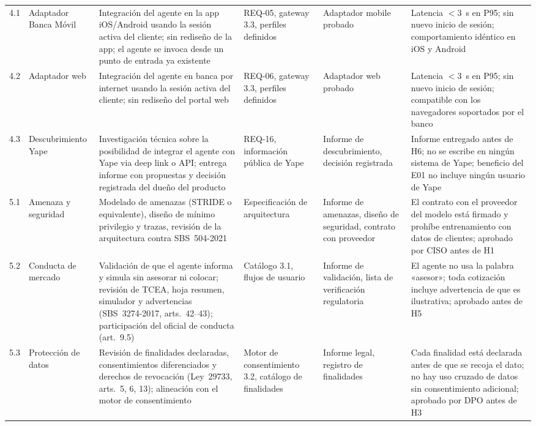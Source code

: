 \documentclass[11pt]{article}
\begin{document}
\begin{longtable}{@{}p{0.7cm} p{2.1cm} p{3.3cm} p{2.3cm} p{2.3cm} p{2.9cm}@{}}
\midrule
4.1 & Adaptador Banca Móvil & Integración del agente en la app iOS/Android usando la sesión activa del cliente; sin rediseño de la app; el agente se invoca desde un punto de entrada ya existente & REQ-05, gateway 3.3, perfiles definidos & Adaptador mobile probado & Latencia $<3$~s en P95; sin nuevo inicio de sesión; comportamiento idéntico en iOS y Android \\[0.3em]
4.2 & Adaptador web & Integración del agente en banca por internet usando la sesión activa del cliente; sin rediseño del portal web & REQ-06, gateway 3.3, perfiles definidos & Adaptador web probado & Latencia $<3$~s en P95; sin nuevo inicio de sesión; compatible con los navegadores soportados por el banco \\[0.3em]
4.3 & Descubrimiento Yape & Investigación técnica sobre la posibilidad de integrar el agente con Yape via deep link o API; entrega informe con propuestas y decisión registrada del dueño del producto & REQ-16, información pública de Yape & Informe de descubrimiento, decisión registrada & Informe entregado antes de H6; no se escribe en ningún sistema de Yape; beneficio del E01 no incluye ningún usuario de Yape \\[0.5em]
\midrule
5.1 & Amenaza y seguridad & Modelado de amenazas (STRIDE o equivalente), diseño de mínimo privilegio y trazas, revisión de la arquitectura contra SBS~504-2021 & Especificación de arquitectura & Informe de amenazas, diseño de seguridad, contrato con proveedor & El contrato con el proveedor del modelo está firmado y prohíbe entrenamiento con datos de clientes; aprobado por CISO antes de H1 \\[0.3em]
5.2 & Conducta de mercado & Validación de que el agente informa y simula sin asesorar ni colocar; revisión de TCEA, hoja resumen, simulador y advertencias (SBS~3274-2017, arts.~42–43); participación del oficial de conducta (art.~9.5) & Catálogo 3.1, flujos de usuario & Informe de validación, lista de verificación regulatoria & El agente no usa la palabra «asesor»; toda cotización incluye advertencia de que es ilustrativa; aprobado antes de H5 \\[0.3em]
5.3 & Protección de datos & Revisión de finalidades declaradas, consentimientos diferenciados y derechos de revocación (Ley~29733, arts.~5, 6, 13); alineación con el motor de consentimiento & Motor de consentimiento 3.2, catálogo de finalidades & Informe legal, registro de finalidades & Cada finalidad está declarada antes de que se recoja el dato; no hay uso cruzado de datos sin consentimiento adicional; aprobado por DPO antes de H3 \\[0.3em]

\end{longtable}
\end{document}
